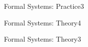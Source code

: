 \documentclass[a4paper]{article}
\begin{document}
\header

\begin{problem}{Formal Systems: Practice}{3}
\end{problem}

\begin{problem}{Formal Systems: Theory}{4}
\end{problem}

\begin{problem}{Formal Systems: Theory}{3}
\end{problem}
\end{document}
